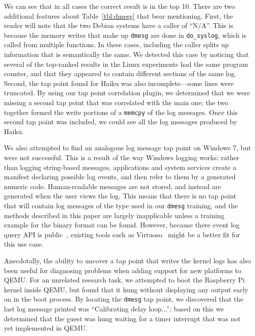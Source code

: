 We can see that in all cases the correct result is in the top 10. There
are two additional features about Table~\ref{tbl:dmesg} that bear
mentioning. First, the reader will note that the two Debian systems have
a caller of ``N/A''. This is because the memory writes that make up
\texttt{dmesg} are done in \texttt{do\_syslog}, which is called from
multiple functions. In these cases, including the caller splits up
information that is semantically the same. We detected this case by
noticing that several of the top-ranked results in the Linux experiments
had the same program counter, and that they appeared to contain
different sections of the same log. Second, the tap point found for
Haiku was also incomplete---some lines were truncated. By using our tap
point correlation plugin, we determined that we were missing a second
tap point that was correlated with the main one; the two together formed
the write portions of a \texttt{memcpy} of the log messages. Once this
second tap point was included, we could see all the log messages
produced by Haiku.

We also attempted to find an analogous log message tap point on Windows
7, but were not successful. This is a result of the way Windows logging
works: rather than logging string-based messages, applications and
system services create a manifest declaring possible log events, and
then refer to them by a generated numeric code. Human-readable messages
are not stored, and instead are generated when the user views the log.
This means that there is no tap point that will contain log messages of
the type used in our \texttt{dmesg} training, and the methods described
in this paper are largely inapplicable unless a training example for the
binary format can be found. However, because there event log query API
is public~\cite{evtquery}, existing tools such as
Virtuoso~\cite{Dolan-Gavitt:2011uq} might be a better fit for this use
case.

Anecdotally, the ability to uncover a tap point that writes the kernel
logs has also been useful for diagnosing problems when adding support
for new platforms to QEMU. For an unrelated research task, we attempted
to boot the Raspberry Pi~\cite{raspberrypi} kernel inside QEMU, but
found that it hung without displaying any output early on in the boot
process. By locating the \texttt{dmesg} tap point, we discovered that
the last log message printed was ``Calibrating delay loop...''; based on
this we determined that the guest was hung waiting for a timer interrupt
that was not yet implemented in QEMU.

